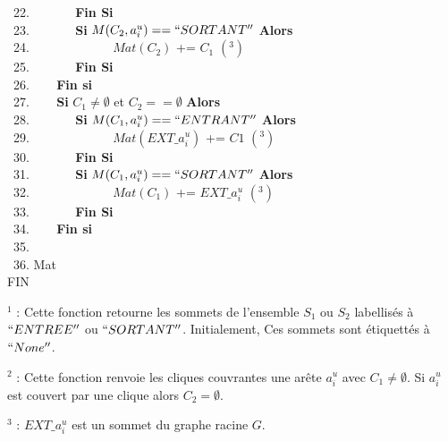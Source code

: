 \begin{algorithm}[!ht]
~22. \indent ~~~~~~  {\bf Fin Si} \\
~23. \indent ~~~~~~  {\bf Si}  $M(C_2, a_i^u) == ``SORTANT''$ {\bf Alors} \\
~24. \indent ~~~~~~~~~~~~ $Mat(C_2)$ += $C_1$ $(^3)$ \\  
~25. \indent ~~~~~~  {\bf Fin Si} \\
~26. \indent ~~~ {\bf Fin si} \\
~27. \indent ~~~ {\bf Si } $C_1 \neq \emptyset$ et $C_2 == \emptyset$ {\bf Alors} \\
~28. \indent ~~~~~~  {\bf Si}  $M(C_1, a_i^u) == ``ENTRANT''$ {\bf Alors} \\
~29. \indent ~~~~~~~~~~~~ $Mat(EXT\_a_i^u)$ += $C1$ $(^3)$\\  
~30. \indent ~~~~~~  {\bf Fin Si} \\
~31. \indent ~~~~~~  {\bf Si}  $M(C_1, a_i^u) == ``SORTANT''$ {\bf Alors} \\
~32. \indent ~~~~~~~~~~~~ $Mat(C_1)$ += $EXT\_a_i^u$ $(^3)$ \\  
~33. \indent ~~~~~~  {\bf Fin Si} \\
~34. \indent ~~~ {\bf Fin si} \\
~35.  \\
~36.  Mat\\
\noindent FIN\\
\end{algorithm}

$^1$ : Cette fonction retourne les sommets de l'ensemble $S_1$ ou $S_2$ labellis\'es \`a $``ENTREE''$ ou $``SORTANT''$. Initialement, Ces sommets sont \'etiquett\'es \`a $``None''$.

$^2$ : Cette fonction renvoie les cliques couvrantes une ar\^ete $a_i^u$ avec $C_1 \ne \emptyset$. Si $a_i^u$ est couvert par une clique alors $C_2 = \emptyset$.

$^3$ : $EXT\_a_i^u$ est un sommet du graphe racine $G$.
\newline

